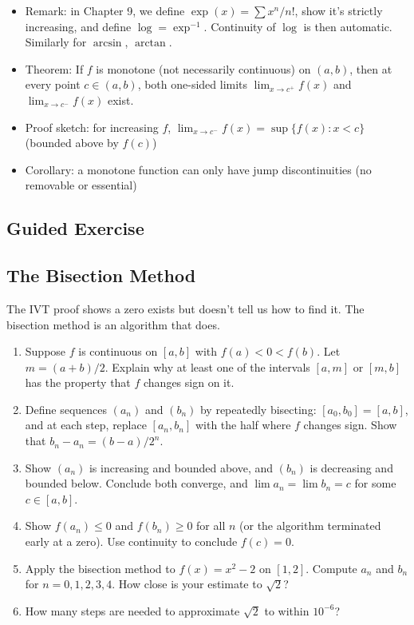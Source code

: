 \documentclass[
  10pt,
  letterpaper,
]{scrbook}
\providecommand{\tightlist}{%
  \setlength{\itemsep}{0pt}\setlength{\parskip}{0pt}}
\begin{document}
\begin{itemize}
  \begin{itemize}
  \tightlist
  \item
    This completes the nth root story: IVT gave existence, the inverse
    theorem gives continuity
  \end{itemize}
\item
  Remark: in Chapter 9, we define \(\exp(x) = \sum x^n/n!\), show it's
  strictly increasing, and define \(\log = \exp^{-1}\). Continuity of
  \(\log\) is then automatic. Similarly for \(\arcsin\), \(\arctan\).
\item
  Theorem: If \(f\) is monotone (not necessarily continuous) on
  \((a,b)\), then at every point \(c \in (a,b)\), both one-sided limits
  \(\lim_{x \to c^+} f(x)\) and \(\lim_{x \to c^-} f(x)\) exist.
\item
  Proof sketch: for increasing \(f\),
  \(\lim_{x \to c^-} f(x) = \sup\{f(x) : x < c\}\) (bounded above by
  \(f(c)\))
\item
  Corollary: a monotone function can only have jump discontinuities (no
  removable or essential)
\end{itemize}

\subsection{Guided Exercise}\label{guided-exercise-13}

\subsection{The Bisection Method}\label{the-bisection-method}

The IVT proof shows a zero exists but doesn't tell us how to find it.
The bisection method is an algorithm that does.

\begin{enumerate}
\def\labelenumi{(\alph{enumi})}
\item
  Suppose \(f\) is continuous on \([a,b]\) with \(f(a) < 0 < f(b)\). Let
  \(m = (a+b)/2\). Explain why at least one of the intervals \([a, m]\)
  or \([m, b]\) has the property that \(f\) changes sign on it.
\item
  Define sequences \((a_n)\) and \((b_n)\) by repeatedly bisecting:
  \([a_0, b_0] = [a, b]\), and at each step, replace \([a_n, b_n]\) with
  the half where \(f\) changes sign. Show that
  \(b_n - a_n = (b-a)/2^n\).
\item
  Show \((a_n)\) is increasing and bounded above, and \((b_n)\) is
  decreasing and bounded below. Conclude both converge, and
  \(\lim a_n = \lim b_n = c\) for some \(c \in [a,b]\).
\item
  Show \(f(a_n) \leq 0\) and \(f(b_n) \geq 0\) for all \(n\) (or the
  algorithm terminated early at a zero). Use continuity to conclude
  \(f(c) = 0\).
\item
  Apply the bisection method to \(f(x) = x^2 - 2\) on \([1, 2]\).
  Compute \(a_n\) and \(b_n\) for \(n = 0, 1, 2, 3, 4\). How close is
  your estimate to \(\sqrt{2}\)?
\item
  How many steps are needed to approximate \(\sqrt{2}\) to within
  \(10^{-6}\)?
\end{enumerate}
\end{document}
